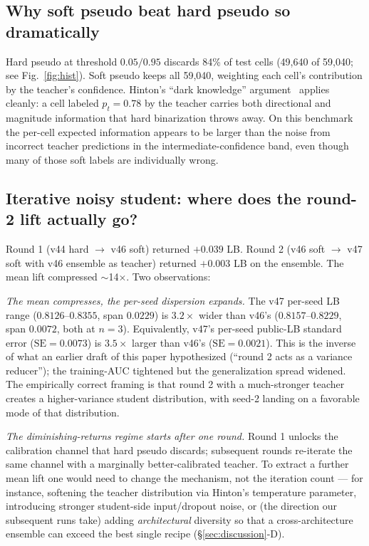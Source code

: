 \documentclass[conference]{IEEEtran}
\begin{document}
\subsection{Why soft pseudo beat hard pseudo so dramatically}

Hard pseudo at threshold $0.05/0.95$ discards 84\% of test cells (49{,}640 of 59{,}040; see Fig.~\ref{fig:hist}). Soft pseudo keeps all 59{,}040, weighting each cell's contribution by the teacher's confidence. Hinton's ``dark knowledge'' argument~\cite{hinton2015distilling} applies cleanly: a cell labeled $p_t = 0.78$ by the teacher carries both directional and magnitude information that hard binarization throws away. On this benchmark the per-cell expected information appears to be larger than the noise from incorrect teacher predictions in the intermediate-confidence band, even though many of those soft labels are individually wrong.

\subsection{Iterative noisy student: where does the round-2 lift actually go?}

Round 1 (v44 hard $\rightarrow$ v46 soft) returned $+0.039$ LB. Round 2 (v46 soft $\rightarrow$ v47 soft with v46 ensemble as teacher) returned $+0.003$ LB on the ensemble. The mean lift compressed $\sim$14$\times$. Two observations:

\emph{The mean compresses, the per-seed dispersion expands.} The v47 per-seed LB range ($0.8126$--$0.8355$, span $0.0229$) is $3.2\times$ wider than v46's ($0.8157$--$0.8229$, span $0.0072$, both at $n=3$). Equivalently, v47's per-seed public-LB standard error ($\mathrm{SE} = 0.0073$) is $3.5\times$ larger than v46's ($\mathrm{SE} = 0.0021$). This is the inverse of what an earlier draft of this paper hypothesized (``round 2 acts as a variance reducer''); the training-AUC tightened but the generalization spread widened. The empirically correct framing is that round 2 with a much-stronger teacher creates a higher-variance student distribution, with seed-2 landing on a favorable mode of that distribution.

\emph{The diminishing-returns regime starts after one round.} Round 1 unlocks the calibration channel that hard pseudo discards; subsequent rounds re-iterate the same channel with a marginally better-calibrated teacher. To extract a further mean lift one would need to change the mechanism, not the iteration count --- for instance, softening the teacher distribution via Hinton's temperature parameter, introducing stronger student-side input/dropout noise, or (the direction our subsequent runs take) adding \emph{architectural} diversity so that a cross-architecture ensemble can exceed the best single recipe (\S\ref{sec:discussion}-D).
\end{document}
